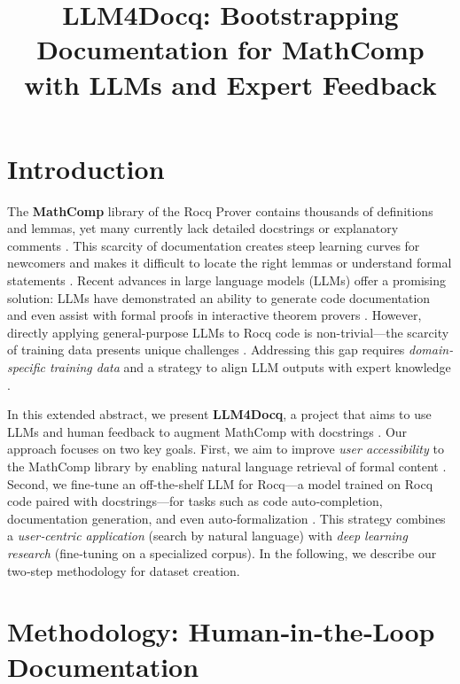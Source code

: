 \documentclass[11pt,a4paper]{article}
\title{LLM4Docq: Bootstrapping Documentation for MathComp with LLMs and Expert Feedback}
\author{}
\date{}
\begin{document}
\maketitle

\section*{Introduction}

The \textbf{MathComp}\cite{mathcomp} library of the Rocq Prover contains thousands of definitions and lemmas, yet many currently lack detailed docstrings or explanatory comments \cite{florath2024coqlm,docstring_findings}. This scarcity of documentation creates steep learning curves for newcomers and makes it difficult to locate the right lemmas or understand formal statements \cite{anonymous2025leanfinder,dvivedi2023comparative}. Recent advances in large language models (LLMs) offer a promising solution: LLMs have demonstrated an ability to generate code documentation and even assist with formal proofs in interactive theorem provers \cite{chakrabarty2024codedoc,song2025leancopilot,wang2024theoremllama,kozyrev2024coqpilot}. However, directly applying general-purpose LLMs to Rocq code is non-trivial—the scarcity of training data presents unique challenges \cite{florath2024coqlm,thompson2025rango}. Addressing this gap requires \emph{domain-specific training data} and a strategy to align LLM outputs with expert knowledge \cite{ouyang2022rlhf}.

In this extended abstract, we present \textbf{LLM4Docq}, a project that aims to use LLMs and human feedback to augment MathComp with docstrings \cite{chakrabarty2024codedoc}. Our approach focuses on two key goals. First, we aim to improve \emph{user accessibility} to the MathComp library by enabling natural language retrieval of formal content \cite{anonymous2025leanfinder}. Second, we fine‑tune an off-the-shelf LLM for Rocq—a model trained on Rocq code paired with docstrings—for tasks such as code auto‑completion, documentation generation, and even auto‑formalization \cite{lu2025autoformalization}. This strategy combines a \emph{user‑centric application} (search by natural language) with \emph{deep learning research} (fine‑tuning on a specialized corpus). In the following, we describe our two‑step methodology for dataset creation.

\section*{Methodology: Human‑in‑the‑Loop Documentation}
\end{document}
